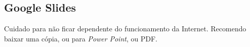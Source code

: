 \subsection{Google Slides}

Cuidado para não ficar dependente do funcionamento da Internet. Recomendo baixar uma cópia, ou para \textit{Power Point}, ou PDF.







